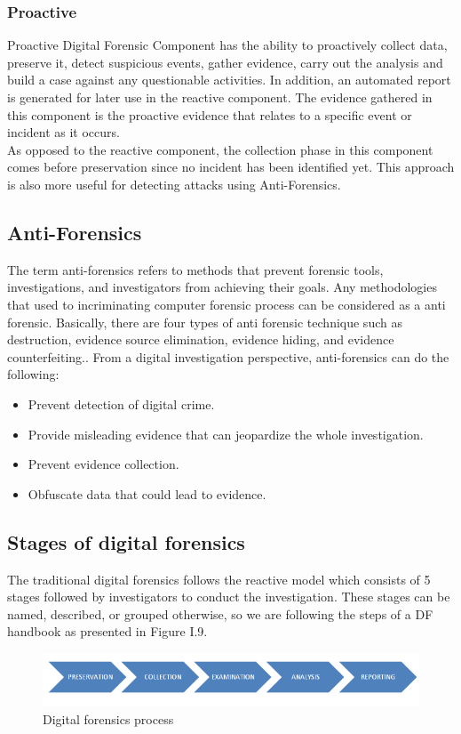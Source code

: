 \subsubsection{Proactive}
Proactive Digital Forensic Component has the ability to proactively collect data, preserve it, detect suspicious events, gather evidence, carry out the analysis and build a case against any questionable activities. In addition, an automated report is generated for later use in the reactive component. The evidence gathered in this component is the proactive evidence that relates to a specific event or incident as it occurs.\\
As opposed to the reactive component, the collection phase in this component comes before preservation since no incident has been identified yet. This approach is also more useful for detecting attacks using Anti-Forensics.


\subsection{Anti-Forensics}
The term anti-forensics refers to methods that prevent forensic tools, investigations, and investigators from achieving their goals. Any methodologies that used to incriminating computer forensic process can be considered as a anti forensic. Basically, there are four types of anti forensic technique such as destruction, evidence source elimination, evidence hiding, and evidence counterfeiting.. From a digital investigation perspective, anti-forensics can do the following:
\begin{itemize}
    \item Prevent detection of digital crime.
    \item Provide misleading evidence that can jeopardize the whole investigation.
    \item Prevent evidence collection.
    \item Obfuscate data that could lead to evidence.
\end{itemize}

\subsection{Stages of digital forensics}
The traditional digital forensics follows the reactive model which consists of 5 stages followed by investigators to conduct the investigation. These stages can be named, described, or grouped otherwise, so we are following the steps of a DF handbook\cite{handbook} as presented in Figure I.9.
\begin{figure}[H]
\centering
\includegraphics[width=1\columnwidth]{Figures/foren.png}
\caption{Digital forensics process}
\end{figure}
